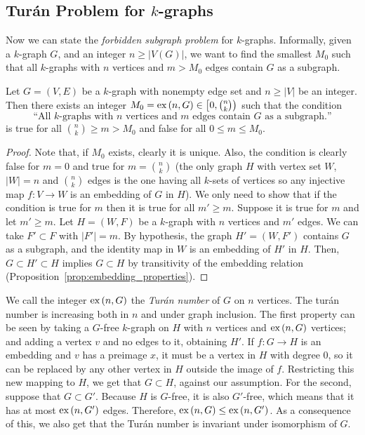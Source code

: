 \subsection{Turán Problem for $k$-graphs}\label{subsec:turan}

Now we can state the \emph{forbidden subgraph problem} for $k$-graphs.
Informally, given a $k$-graph $G$, and an integer $n \geq |V(G)|$,
we want to find the smallest $M_0$ such that all $k$-graphs with $n$ vertices and $m > M_0$ edges
contain $G$ as a subgraph.

\begin{proposition} \label{prop:extremal}
    Let $G = (V, E)$ be a $k$-graph with nonempty edge set and $n \geq |V|$ be an integer.
    Then there exists an integer $M_0 = \text{ex} \left( n, G \right) \in \left[ 0, \binom{n}{k}\right)$ such that
    the condition
    \[
        \text{``All $k$-graphs with $n$ vertices and $m$ edges contain $G$ as a subgraph.''}
    \]
    is true for all $\binom{n}{k} \geq m > M_0$ and false for all $0 \leq m \leq M_0$.

    \begin{proof}
        Note that, if $M_0$ exists, clearly it is unique.
        Also, the condition is clearly false for $m = 0$ and
        true for $m = \binom{n}{k}$
        (the only graph $H$ with vertex set $W$, $|W|=n$ and $\binom{n}{k}$ edges
        is the one having all $k$-sets of vertices so any injective map $f: V \to W$
        is an embedding of $G$ in $H$).
        We only need to show that if the condition is true for $m$ then it is true for
        all $m' \geq m$.
        Suppose it is true for $m$ and let $m' \geq m$.
        Let $H = (W, F)$ be a $k$-graph with $n$ vertices and $m'$ edges.
        We can take $F' \subset F$ with $|F'| = m$.
        By hypothesis, the graph $H' = (W, F')$ contains $G$ as a subgraph,
        and the identity map in $W$ is an embedding of $H'$ in $H$.
        Then, $G \subset H' \subset H$ implies $G \subset H$ by transitivity of the embedding
        relation (Proposition~\ref{prop:embedding_properties}).

    \end{proof}

\end{proposition}

We call the integer $\text{ex} \left( n, G \right)$ the \emph{Turán number} of $G$ on $n$ vertices.
The turán number is increasing both in $n$ and under graph inclusion.
The first property can be seen by taking a $G$-free $k$-graph on $H$ with $n$ vertices
and $\text{ex} \left( n, G \right)$ vertices; and adding a vertex $v$ and no edges to it, obtaining $H'$.
If $f: G \to H$ is an embedding and $v$ has a preimage $x$, it must be a vertex in $H$ with degree $0$,
so it can be replaced by any other vertex in $H$ outside the image of $f$.
Restricting this new mapping to $H$, we get that $G \subset H$, against our assumption.
For the second, suppose that $G \subset G'$.
Because $H$ is $G$-free, it is also $G'$-free, which means that it has at most $\text{ex} \left( n, G' \right)$ edges.
Therefore, $\text{ex} \left( n, G \right) \leq \text{ex} \left( n, G' \right)$.
As a consequence of this, we also get that the Turán number is invariant under isomorphism of $G$.

